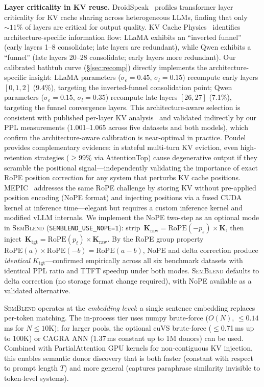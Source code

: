 \documentclass[10pt,twocolumn]{article}
\newcommand{\semblend}{\textsc{SemBlend}\xspace}
\begin{document}
\textbf{Layer criticality in KV reuse.}
DroidSpeak~\cite{droidspeak} profiles transformer layer criticality
for KV cache sharing across heterogeneous LLMs, finding that only
${\sim}11\%$ of layers are critical for output quality.
KV Cache Physics~\cite{kvphysics} identifies architecture-specific
information flow: LLaMA exhibits an ``inverted funnel'' (early layers
1--8 consolidate; late layers are redundant), while Qwen exhibits a
``funnel'' (late layers 20--28 consolidate; early layers more redundant).
Our calibrated bathtub curve (\S\ref{sec:recomp}) directly implements
the architecture-specific insight: LLaMA parameters ($\sigma_e{=}0.45$,
$\sigma_l{=}0.15$) recompute early layers $[0,1,2]$ (9.4\%), targeting
the inverted-funnel consolidation point; Qwen parameters
($\sigma_e{=}0.15$, $\sigma_l{=}0.35$) recompute late layers
$[26,27]$ (7.1\%), targeting the funnel convergence layers.
This architecture-aware selection is consistent with published
per-layer KV analysis~\cite{kvphysics,droidspeak} and validated
indirectly by our PPL measurements (1.001--1.065 across five
datasets and both models), which confirm the architecture-aware
calibration is near-optimal in practice.
Poudel~\cite{statefulkv} provides complementary evidence: in
stateful multi-turn KV eviction, even high-retention strategies
(${\geq}99\%$ via AttentionTop) cause degenerative output if
they scramble the positional signal---independently validating
the importance of exact RoPE position correction for any system
that perturbs KV cache positions.
MEPIC~\cite{mepic} addresses the same RoPE challenge by storing KV
without pre-applied position encoding (NoPE format) and injecting
positions via a fused CUDA kernel at inference time---elegant but
requires a custom inference kernel and modified vLLM internals.
We implement the NoPE two-step as an optional mode in \semblend
(\texttt{SEMBLEND\_USE\_NOPE=1}): strip~$\mathbf{K}_\text{raw}{=}\mathrm{RoPE}({-}p_s){\times}\mathbf{K}$,
then inject~$\mathbf{K}_\text{tgt}{=}\mathrm{RoPE}(p_t){\times}\mathbf{K}_\text{raw}$.
By the RoPE group property $\mathrm{RoPE}(a){\times}\mathrm{RoPE}(-b){=}\mathrm{RoPE}(a{-}b)$,
NoPE and delta correction produce \emph{identical} $K_\text{tgt}$---confirmed
empirically across all six benchmark datasets with
identical PPL ratio and TTFT speedup under both modes.
\semblend defaults to delta correction (no storage format change
required), with NoPE available as a validated alternative.

\semblend operates at the \emph{embedding level}: a single sentence
embedding replaces per-token matching. The in-process tier uses numpy
brute-force ($O(N)$, ${\leq}0.14$\,ms for $N{\leq}10\text{K}$); for
larger pools, the optional cuVS brute-force (${\leq}$0.71\,ms up to 100K) or
CAGRA ANN ($\mathbf{1.37}$\,ms constant up to 1M donors) can be used.
Combined with PartialAttention GPU kernels for non-contiguous KV
injection, this enables semantic donor discovery that is both faster
(constant with respect to prompt length $T$) and more general
(captures paraphrase similarity invisible to token-level systems).
\end{document}
